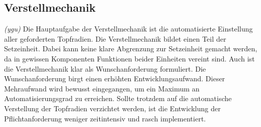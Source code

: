 \subsection{Verstellmechanik}
\label{verstellmechanik}
\textit{(ygu)} Die Hauptaufgabe der Verstellmechanik ist die automatisierte Einstellung aller geforderten Topfradien. Die Verstellmechanik bildet einen Teil der Setzeinheit. Dabei kann keine klare Abgrenzung zur Setzeinheit gemacht werden, da in gewissen Komponenten Funktionen beider Einheiten vereint sind. Auch ist die Verstellmechanik klar als Wunschanforderung formuliert. Die Wunschanforderung birgt einen erhöhten Entwicklungsaufwand. Dieser Mehraufwand wird bewusst eingegangen, um ein Maximum an Automatisierungsgrad zu erreichen. Sollte trotzdem auf die automatische Verstellung der Topfradien verzichtet werden, ist die Entwicklung der Pflichtanforderung weniger zeitintensiv und rasch implementiert.
